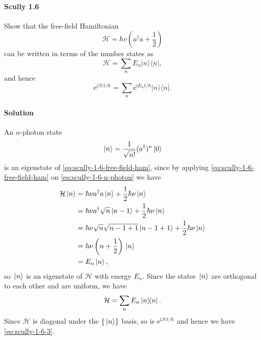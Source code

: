 \documentclass[hyperref, a4paper]{article}
\newcommand*{\ii}{\mathrm{i}}
\newcommand*{\ee}{\mathrm{e}}
\newcommand{\mathscr}{\mathcal}
\begin{document}
\paragraph{}

\paragraph{Scully 1.6} Show that the free-field Hamiltonian
\begin{equation}
    \mathscr{H}=\hbar v\left(a^{\dagger} a+\frac{1}{2}\right)
    \label{eq:scully-1-6-free-field-ham}
\end{equation}
can be written in terms of the number states as
\[
\mathscr{H}=\sum_{n} E_{n}|n\rangle\langle n|,
\]
and hence
\begin{equation}
    \ee^{\ii \mathscr{H} t / \hbar}=\sum_{n} \ee^{\ii E_{n} t / \hbar}|n\rangle\langle n|.
    \label{eq:scully-1-6-3}
\end{equation}

\paragraph{Solution} An $n$-photon state
\begin{equation}
    \ket*{n} = \frac{1}{\sqrt{n!}} (a^\dagger)^n \ket*{0}
    \label{eq:scully-1-6-n-photon}
\end{equation}
is an eigenstate of \eqref{eq:scully-1-6-free-field-ham}, since by applying \eqref{eq:scully-1-6-free-field-ham} on \eqref{eq:scully-1-6-n-photon} we have
\[
    \begin{aligned}
        \mathcal{H} \ket*{n} &= \hbar \nu a^\dagger a \ket*{n} + \frac{1}{2} \hbar \nu \ket*{n} \\
        &= \hbar \nu a^\dagger \sqrt{n} \ket*{n-1} + \frac{1}{2} \hbar \nu \ket*{n} \\
        &= \hbar \nu \sqrt{n} \sqrt{n-1+1} \ket*{n-1+1} + \frac{1}{2} \hbar \nu \ket*{n} \\
        &= \hbar \nu \left( n + \frac{1}{2} \right) \ket*{n} \\
        &= E_n \ket*{n},
    \end{aligned}
\]
so $\ket*{n}$ is an eigenstate of $\mathcal{H}$ with energy $E_n$.
Since the states $\ket*{n}$ are orthogonal to each other and are uniform, we have
\begin{equation}
    \mathcal{H} = \sum_n E_n \dyad*{n}.
\end{equation}
Since $\mathcal{H}$ is diagonal under the $\{\ket*{n}\}$ basis, so is $\ee^{\ii \mathcal{H} t / \hbar}$ and hence we have \eqref{eq:scully-1-6-3}.
\end{document}
